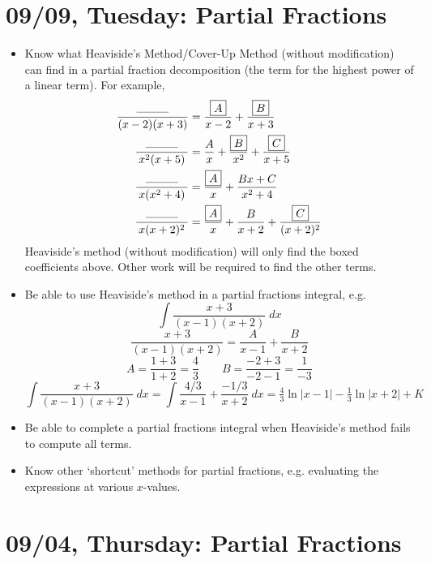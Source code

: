 \documentclass[11pt,letterpaper]{article}
\begin{document}
\section*{09/09, Tuesday: Partial Fractions\label{09-09}}

\begin{itemize}
\item Know what Heaviside's Method/Cover-Up Method (without modification) can find in a partial fraction decomposition (the term for the highest power of a linear term). For example, 
	\[
	\begin{aligned}
	\dfrac{\;\;\;\rule{1cm}{0.3pt}\;\;\;}{(x - 2)(x + 3)}&= \dfrac{\boxed{A}}{x - 2} + \dfrac{\boxed{B}}{x + 3} \\
	\dfrac{\;\;\;\rule{1cm}{0.3pt}\;\;\;}{x^2(x + 5)}&= \dfrac{A}{x} + \dfrac{\boxed{B}}{x^2} + \dfrac{\boxed{C}}{x + 5} \\
	\dfrac{\;\;\;\rule{1cm}{0.3pt}\;\;\;}{x(x^2 + 4)}&= \dfrac{\boxed{A}}{x} + \dfrac{Bx + C}{x^2 + 4} \\
	\dfrac{\;\;\;\rule{1cm}{0.3pt}\;\;\;}{x(x + 2)^2}&= \dfrac{\boxed{A}}{x} + \dfrac{B}{x + 2} + \dfrac{\boxed{C}}{(x + 2)^2}
	\end{aligned}
	\]
Heaviside's method (without modification) will only find the boxed coefficients above. Other work will be required to find the other terms. 

\item Be able to use Heaviside's method in a partial fractions integral, e.g. 
	\[
	\int \dfrac{x + 3}{(x - 1)(x + 2)} \;dx
	\]
	\[
	\dfrac{x + 3}{(x - 1)(x + 2)}= \dfrac{A}{x - 1} + \dfrac{B}{x + 2}
	\]
	\[
	A= \dfrac{1 + 3}{1 + 2}= \dfrac{4}{3} \qquad B= \dfrac{-2 + 3}{-2 - 1}= \dfrac{1}{-3}
	\]
	\[
	\int \dfrac{x + 3}{(x - 1)(x + 2)} \;dx= \int \dfrac{4/3}{x - 1} + \dfrac{-1/3}{x + 2} \;dx= \tfrac{4}{3} \ln|x - 1| - \tfrac{1}{3} \ln|x + 2| + K
	\]

\item Be able to complete a partial fractions integral when Heaviside's method fails to compute all terms. 

\item Know other `shortcut' methods for partial fractions, e.g. evaluating the expressions at various $x$-values. 
\end{itemize}

\newpage
\section*{09/04, Thursday: Partial Fractions\label{09-04}}
\end{document}
